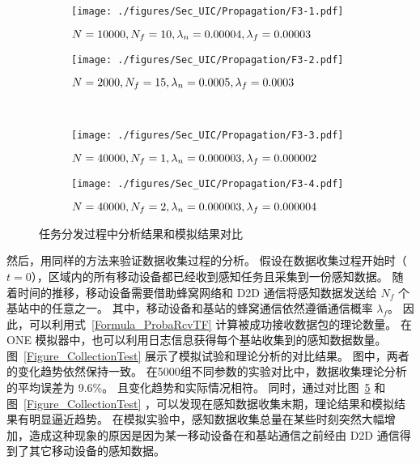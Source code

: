 \begin{figure}[!h]
  \centering
  \begin{subfigure}[h]{0.48\linewidth}
    \centering
    \texttt{[image: ./figures/Sec\_UIC/Propagation/F3-1.pdf]}
    \label{Figure_PropagationTestA}
    \vspace{-1.5em}
    \caption{$N=10000, N_f=10, \\\lambda_n=0.00004,\lambda_f=0.00003$}
  \end{subfigure}
  \begin{subfigure}[h]{0.48\linewidth}
    \centering
    \texttt{[image: ./figures/Sec\_UIC/Propagation/F3-2.pdf]}
    \label{Figure_PropagationTestB}
    \vspace{-1.5em}
    \caption{$N=2000, N_f=15, \\\lambda_n=0.0005,\lambda_f=0.0003$}
  \end{subfigure}\\
  \begin{subfigure}[h]{0.48\linewidth}
    \centering
    \texttt{[image: ./figures/Sec\_UIC/Propagation/F3-3.pdf]}
    \label{Figure_PropagationTestC}
    \vspace{-1.5em}
    \caption{$N=40000, N_f=1, \\\lambda_n=0.000003,\lambda_f=0.000002$}
  \end{subfigure}
  \begin{subfigure}[h]{0.48\linewidth}
    \centering
    \texttt{[image: ./figures/Sec\_UIC/Propagation/F3-4.pdf]}
    \label{Figure_PropagationTestD}
    \vspace{-1.5em}
    \caption{$N=40000, N_f=2, \\\lambda_n=0.000003,\lambda_f=0.000004$}
  \end{subfigure}
  \vspace{-0.5em}
  \caption{任务分发过程中分析结果和模拟结果对比}
\label{Figure_PropagationTest}
\end{figure}

然后，用同样的方法来验证数据收集过程的分析。
假设在数据收集过程开始时（$t=0$），区域内的所有移动设备都已经收到感知任务且采集到一份感知数据。
随着时间的推移，移动设备需要借助蜂窝网络和 D2D 通信将感知数据发送给 $N_f$ 个基站中的任意之一。
其中，移动设备和基站的蜂窝通信依然遵循通信概率 $\lambda_f$。
因此，可以利用式~\eqref{Formula_ProbaRcvTF} 计算被成功接收数据包的理论数量。
在 ONE 模拟器中，也可以利用日志信息获得每个基站收集到的感知数据数量。
图~\ref{Figure_CollectionTest} 展示了模拟试验和理论分析的对比结果。
图中，两者的变化趋势依然保持一致。
在5000组不同参数的实验对比中，数据收集理论分析的平均误差为 9.6\%。
且变化趋势和实际情况相符。
同时，通过对比图~\ref{Figure_PropagationTest} 和图~\ref{Figure_CollectionTest} ，可以发现在感知数据收集末期，理论结果和模拟结果有明显逼近趋势。
在模拟实验中，感知数据收集总量在某些时刻突然大幅增加，造成这种现象的原因是因为某一移动设备在和基站通信之前经由 D2D 通信得到了其它移动设备的感知数据。

